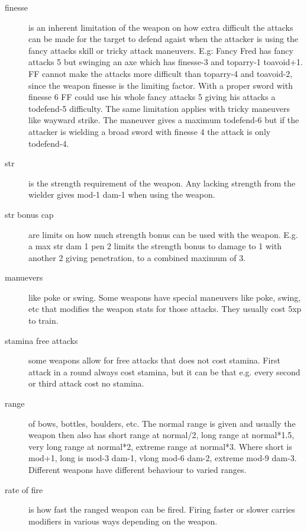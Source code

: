 \begin{description}
\item[finesse] is an inherent limitation of the weapon on how extra difficult the attacks can be made for the target to defend agaist when the attacker is using the fancy attacks skill or tricky attack maneuvers. 
E.g: Fancy Fred has fancy attacks 5 but swinging an axe which has finesse-3 and toparry-1 toavoid+1. FF cannot make the attacks more difficult than toparry-4 and toavoid-2, since the weapon finesse is the limiting factor. With a proper sword with finesse 6 FF could use his whole fancy attacks 5 giving his attacks a todefend-5 difficulty.
The same limitation applies with tricky maneuvers like wayward strike. The maneuver gives a maximum todefend-6 but if the attacker is wielding a broad sword with finesse 4 the attack is only todefend-4.

\item[str] is the strength requirement of the weapon. Any lacking strength from the wielder gives mod-1 dam-1 when using the weapon.

\item[str bonus cap] are limits on how much strength bonus can be used with the weapon. E.g. a max str dam 1 pen 2 limits the strength bonus to damage to 1 with another 2 giving penetration, to a combined maximum of 3.

\item[manuevers] like poke or swing. Some weapons have special maneuvers like poke, swing, etc that modifies the weapon stats for those attacks. They usually cost 5xp to train.

\item[stamina free attacks] some weapons allow for free attacks that does not cost stamina. First attack in a round always cost stamina, but it can be that e.g. every second or third attack cost no stamina.

\item[range] of bows, bottles, boulders, etc. The normal range is given and usually the weapon then also has short range at normal/2, long range at normal*1.5, very long range at normal*2, extreme range at normal*3. Where short is mod+1, long is mod-3 dam-1, vlong mod-6 dam-2, extreme mod-9 dam-3. Different weapons have different behaviour to varied ranges.

\item[rate of fire] is how fast the ranged weapon can be fired. Firing faster or slower carries modifiers in various ways depending on the weapon.


\end{description}
